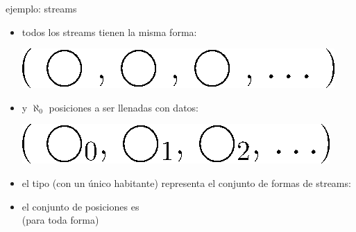 \documentclass[9pt]{beamer}
\newcommand{\saltar}{\vspace{1ex}}
\begin{document}
\begin{frame}{ejemplo: streams}
  \begin{itemize}
  \item todos los streams tienen la misma forma:\saltar
    \begin{center}\hspace{-2cm}\includegraphics[scale=0.5]{img/estreamsh.eps}\end{center}
    \pause
  \item y $\aleph_0$ posiciones a ser llenadas con datos: \saltar
    \begin{center}\hspace{-2cm}\includegraphics[scale=0.5]{img/estreampos.eps}\end{center}
    \pause
  \end{itemize}
  \begin{itemize} [triangle]
  \item el tipo  (con un único habitante) representa el conjunto de formas de streams:\\
  \item el conjunto de posiciones es \\\vspace{-0.5ex} {\small (para toda forma)}
  \end{itemize}
\end{frame}
\end{document}
